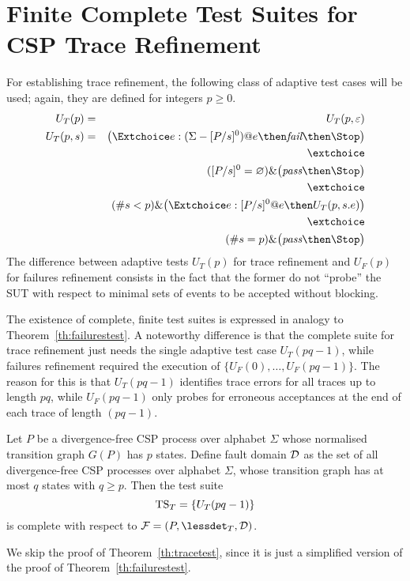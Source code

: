 \section{Finite Complete Test Suites for CSP Trace Refinement}
\label{sec:finitecomplete}

For establishing trace refinement, the following class of adaptive test cases
will be used; again, they are defined for integers $p \ge 0$.
%
\begin{eqnarray}
U_T(p) & = & U_T(p,\varepsilon)
\\
U_T(p,s) & = & \big(\Extchoice e:(\Sigma - [P/s]^0) @ e \then \efail\then \Stop \big)
\label{eq:uta}
\\ & & \extchoice \nonumber
\\ & & ([P/s]^0 = \varnothing)    \&   \big( \epass \then \Stop \big)
\label{eq:utb}
\\ & & \extchoice \nonumber
\\ & & (\#s < p) \& \big(\Extchoice e:[P/s]^0 @ e \then U_T(p,s.e) \big)
\label{eq:utc}
\\ & & \extchoice \nonumber
\\ & & (\#s = p) \& \big( \epass\then \Stop  \big)
\label{eq:utd}
\end{eqnarray}
%
The difference between adaptive tests $U_T(p)$ for trace refinement and
$U_F(p)$ for failures refinement consists in the fact that the former do not
``probe'' the SUT with respect to minimal sets of events to be accepted
without blocking.

The existence of complete, finite test suites is expressed in analogy to
Theorem~\ref{th:failurestest}. A noteworthy difference is that the complete
suite for trace refinement just needs the single adaptive test case
$U_T(pq-1)$, while failures refinement required the execution of $\{
U_F(0),\dots,U_F(pq-1)\}$. The reason for this is that $U_T(pq-1)$ identifies
trace errors for all traces up to length $pq$, while $U_F(pq-1)$ only probes
for erroneous acceptances at the end of each trace of length $(pq -1)$.

\begin{theorem}\label{th:tracetest}
Let $P$ be a divergence-free CSP process over alphabet $\Sigma$ whose
normalised transition graph $G(P)$ has $p$ states. Define fault domain ${\cal
D}$ as the set of all divergence-free CSP processes over alphabet $\Sigma$,
whose transition graph has at most $q$ states with $q \ge p$. Then the test
suite
\[
{\text{TS}}_T = \{ U_T(pq-1)   \}
\]
is complete with respect to ${\cal F} = (P,\lessdet_T,{\cal D})$.
\xbox
\end{theorem}
%
We skip the proof of Theorem~\ref{th:tracetest}, since it is just a
simplified version of the proof of Theorem~\ref{th:failurestest}.
